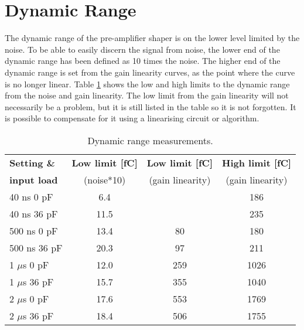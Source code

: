 \documentclass[../main/thesis.tex]{subfiles}
\begin{document}
\section{Dynamic Range}
\label{ide-dynamicrange}
The dynamic range of the pre-amplifier shaper is on the lower level limited by the noise. To be able to easily discern the signal from noise, the lower end of the dynamic range has been defined as 10 times the noise. The higher end of the dynamic range is set from the gain linearity curves, as the point where the curve is no longer linear. Table \ref{tab-dynrange} shows the low and high limits to the dynamic range from the noise and gain linearity. The low limit from the gain linearity will not necessarily be a problem, but it is still listed in the table so it is not forgotten. It is possible to compensate for it using a linearising circuit or algorithm. 

\begin{table}[h!]
	\begin{center}
		\caption{Dynamic range measurements.}
		\label{tab-dynrange}
		\begin{tabular}{lccc}\toprule
			\textbf{Setting \&}     & \textbf{Low limit [fC]} & \textbf{Low limit [fC]}      & \textbf{High limit [fC]}     \\
			\textbf{input load}    & (noise*10) & (gain linearity) & (gain linearity) \\ \midrule
			40 ns 0 pF     & 6.4     &                & 186            \\
			40 ns 36 pF    & 11.5     &                & 235            \\
			500 ns 0 pF    & 13.4     & 80             & 180            \\
			500 ns 36 pF   & 20.3    & 97             & 211            \\
			1 $\mu$s 0 pF  & 12.0    & 259            & 1026           \\
			1 $\mu$s 36 pF & 15.7     & 355            & 1040           \\
			2 $\mu$s 0 pF  & 17.6    & 553            & 1769           \\
			2 $\mu$s 36 pF & 18.4    & 506            & 1755    \\ \bottomrule
		\end{tabular}
	\end{center}
\end{table}
\end{document}
